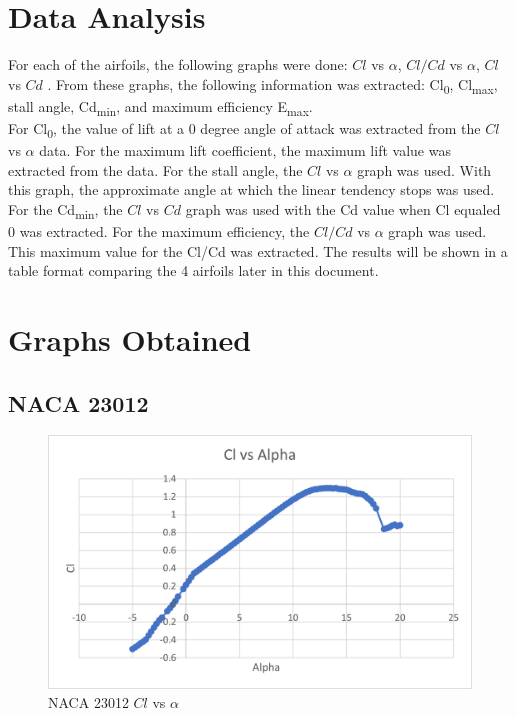\documentclass{article}
\begin{document}
\section{Data Analysis}
For each of the airfoils, the following graphs were done: $Cl$ vs $\alpha$, $Cl/Cd$ vs $\alpha$, $Cl$ vs $Cd$ . From these graphs, the following information was extracted: Cl\textsubscript{0}, Cl\textsubscript{max}, stall angle, Cd\textsubscript{min}, and maximum efficiency E\textsubscript{max}.\\

For Cl\textsubscript{0}, the value of lift at a 0 degree angle of attack was extracted from the $Cl$ vs $\alpha$ data. For the maximum lift coefficient, the maximum lift value was extracted from the data. For the stall angle, the $Cl$ vs $\alpha$ graph was used. With this graph, the approximate angle at which the linear tendency stops was used. For the Cd\textsubscript{min}, the $Cl$ vs $Cd$ graph was used with the Cd value when Cl equaled 0 was extracted. For the maximum efficiency, the $Cl/Cd$ vs $\alpha$ graph was used. This maximum value for the Cl/Cd was extracted. The results will be shown in a table format comparing the 4 airfoils later in this document.

\section{Graphs Obtained}
\subsection{NACA 23012}
\begin{figure}[!h]
\begin{center}
	\includegraphics[scale=0.7]{NACA 23012 Clalpha.png}
	\caption{NACA 23012 $Cl$ vs $\alpha$}
	\label{Figure1:}
\end{center}
\end{figure}
\end{document}
